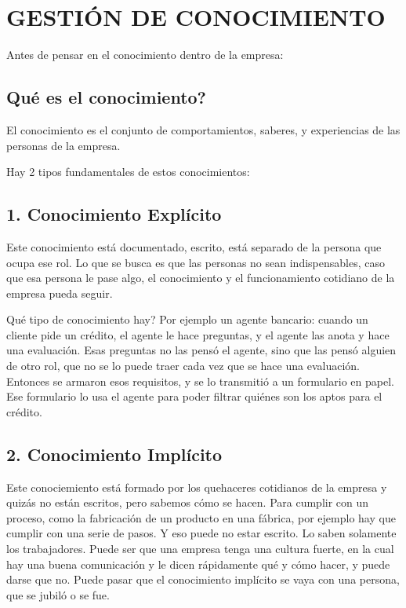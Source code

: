 \clearpage
\twocolumn
\hypertarget{gestiuxf3n-de-conocimiento}{%
\section{GESTIÓN DE CONOCIMIENTO}\label{unidad-4-gestiuxf3n-de-conocimiento}}


Antes de pensar en el conocimiento dentro de la empresa:

\subsection{Qué es el conocimiento?}

El conocimiento es el conjunto de comportamientos, saberes, y
experiencias de las personas de la empresa.

Hay 2 tipos fundamentales de
estos conocimientos:

\hypertarget{conocimiento-expluxedcito}{%
\subsection{1. Conocimiento Explícito}\label{conocimiento-expluxedcito}}

Este conocimiento está documentado, escrito, está separado de la persona
que ocupa ese rol. Lo que se busca es que las personas no sean
indispensables, caso que esa persona le pase algo, el conocimiento y el
funcionamiento cotidiano de la empresa pueda seguir.

Qué tipo de conocimiento hay? Por ejemplo un agente bancario: cuando un
cliente pide un crédito, el agente le hace preguntas, y el agente las
anota y hace una evaluación. Esas preguntas no las pensó el agente, sino
que las pensó alguien de otro rol, que no se lo puede traer cada vez que
se hace una evaluación. Entonces se armaron esos requisitos, y se lo
transmitió a un formulario en papel. Ese formulario lo usa el agente
para poder filtrar quiénes son los aptos para el crédito.

\hypertarget{conocimiento-impluxedcito}{%
\subsection{2. Conocimiento Implícito}\label{conocimiento-impluxedcito}}

Este conociemiento está formado por los quehaceres cotidianos de la
empresa y quizás no están escritos, pero sabemos cómo se hacen. Para
cumplir con un proceso, como la fabricación de un producto en una
fábrica, por ejemplo hay que cumplir con una serie de pasos. Y eso puede
no estar escrito. Lo saben solamente los trabajadores. Puede ser que una
empresa tenga una cultura fuerte, en la cual hay una buena comunicación
y le dicen rápidamente qué y cómo hacer, y puede darse que no. Puede
pasar que el conocimiento implícito se vaya con una persona, que se
jubiló o se fue.

